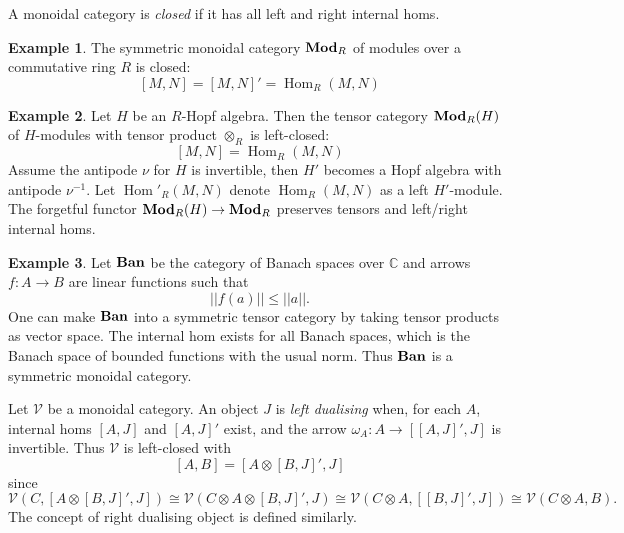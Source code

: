 \documentclass[8pt]{article}
\theoremstyle{definition}
\theoremstyle{definition}
\theoremstyle{definition}
\theoremstyle{definition}
\theoremstyle{definition}
\theoremstyle{definition}
\theoremstyle{definition}
\theoremstyle{definition}
\theoremstyle{definition}
\theoremstyle{definition}
\theoremstyle{definition}
\theoremstyle{definition}
\newtheorem{example}{Example}[section]
\theoremstyle{definition}
\theoremstyle{definition}
\theoremstyle{question}
\begin{document}
A monoidal category is \emph{closed} if it has all left and right internal homs.

\begin{example}
  The symmetric monoidal category ${\bf Mod}_R$ of modules over a commutative ring $R$ is closed:
  \[
  [M, N] = [M, N]' = \operatorname{Hom}_R(M, N)
  \]
\end{example}

\begin{example}
  Let $H$ be an $R$-Hopf algebra. Then the tensor category ${\bf Mod}_R(H)$ of $H$-modules with tensor product $\otimes_R$ is left-closed:
  \[
  [M, N] = \operatorname{Hom}_R(M, N)
  \]
  Assume the antipode $\nu$ for $H$ is invertible, then $H'$ becomes a Hopf algebra with antipode $\nu^{-1}$.
  Let $\operatorname{Hom}'_R(M,N)$ denote $\operatorname{Hom}_R(M,N)$ as a left $H'$-module. The forgetful functor 
  ${\bf Mod}_R(H) \to {\bf Mod}_R$ preserves tensors and left/right internal homs.
\end{example}

\begin{example}
  Let ${\bf Ban}$ be the category of Banach spaces over $\mathbb{C}$ and arrows $f : A \to B$ are linear functions such that
  \[
  ||f(a)|| \leq ||a||.
  \]
  One can make ${\bf Ban}$ into a symmetric tensor category by taking tensor products as vector space. The internal hom exists for all Banach spaces,
  which is the Banach space of bounded functions with the usual norm. Thus ${\bf Ban}$ is a symmetric monoidal category.
\end{example}

Let $\mathcal{V}$ be a monoidal category. An object $J$ is \emph{left dualising} when, for each $A$, internal homs 
$[A, J]$ and $[A, J]'$ exist, and the arrow $\omega_A : A \to [[A, J]', J]$ is invertible. Thus $\mathcal{V}$ is left-closed with
\[
[A,B] = [A \otimes [B, J]', J]
\]
since
\[
\mathcal{V}(C, [A \otimes [B,J]',J]) \cong \mathcal{V}(C \otimes A \otimes [B,J]',J) \cong \mathcal{V}(C \otimes A, [[B,J]',J]) \cong \mathcal{V}(C \otimes A, B).
\]
The concept of right dualising object is defined similarly.
\end{document}
